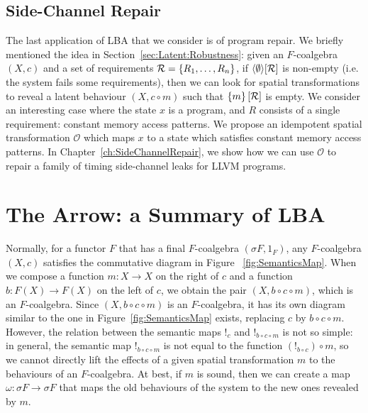 {%



\subsection{Side-Channel Repair}
The last application of LBA that we consider is of program repair. We briefly mentioned the idea in Section~\ref{sec:Latent:Robustness}: given an $F$-coalgebra $(X,c)$ and a set of requirements $\mathcal{R}=\left\{R_1, \ldots, R_n\right\}$, if ${{\left<\emptyset\right>}}[\mathcal{R}]$ is non-empty (i.e. the system fails some requirements), then we can look for spatial transformations to reveal a latent behaviour $(X,c\circ m)$ such that $\left\{m\right\}[\mathcal{R}]$ is empty. We consider an interesting case where the state $x$ is a program, and $R$ consists of a single requirement: constant memory access patterns. We propose an idempotent spatial transformation $\mathcal{O}$ which maps $x$ to a state which satisfies constant memory access patterns. In Chapter~\ref{ch:SideChannelRepair}, we show how we can use $\mathcal{O}$ to repair a family of timing side-channel leaks for LLVM programs.

\section{The Arrow: a Summary of LBA}
Normally, for a functor $F$ that has a final $F$-coalgebra $(\sigma F, 1_F)$, any $F$-coalgebra $(X,c)$ satisfies the commutative diagram in Figure ~\ref{fig:SemanticsMap}. 
When we compose a function $m\colon X\rightarrow X$ on the right of $c$ and a function $b\colon F(X)\rightarrow F(X)$ on the left of $c$, we obtain the pair $(X,b\circ c\circ m)$, which is an $F$-coalgebra. Since $(X,b\circ c\circ m)$ is an $F$-coalgebra, it has its own diagram similar to the one in Figure~\ref{fig:SemanticsMap} exists, replacing $c$ by $b\circ c\circ m$. However, the relation between the semantic maps $!_{c}$ and $!_{b\circ c\circ m}$ is not so simple: in general, the semantic map $!_{b\circ c\circ m}$ is not equal to the function $(!_{b\circ c})\circ m$, so we cannot directly lift the effects of a given spatial transformation $m$ to the behaviours of an $F$-coalgebra. At best, if $m$ is sound, then we can create a map $\omega\colon \sigma F\rightarrow \sigma F$ that maps the old behaviours of the system to the new ones revealed by $m$. 

}

